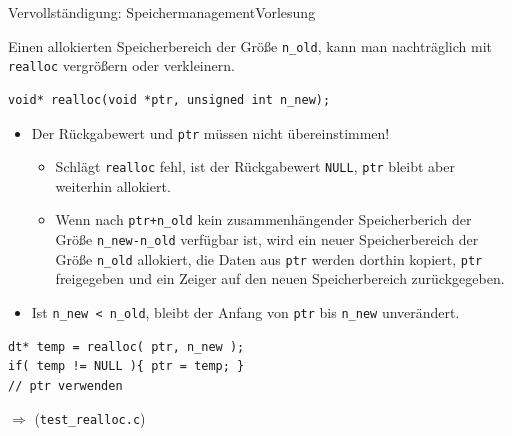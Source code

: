 \documentclass[xcolor=dvipsnames]{beamer}
\newcounter{lecturecounter}
\begin{document}
\begin{frame}[fragile]{Vervollständigung: Speichermanagement}{Vorlesung }
\begin{block}{}
  Einen allokierten Speicherbereich der Größe \verb|n_old|, kann man nachträglich mit \verb|realloc| vergrößern oder verkleinern.
\end{block}
\begin{lstlisting}
void* realloc(void *ptr, unsigned int n_new);
\end{lstlisting}
\begin{itemize}
  \item{Der Rückgabewert und \verb|ptr| müssen nicht übereinstimmen!}
  \begin{itemize}
    \item{Schlägt \verb|realloc| fehl, ist der Rückgabewert \verb|NULL|, \verb|ptr| bleibt aber weiterhin allokiert.}
    \item{Wenn nach \verb|ptr+n_old| kein zusammenhängender Speicherberich der Größe \verb|n_new-n_old| verfügbar ist, wird ein neuer Speicherbereich der Größe \verb|n_old| allokiert, die Daten aus \verb|ptr| werden dorthin kopiert, \verb|ptr| freigegeben und ein Zeiger auf den neuen Speicherbereich zurückgegeben.}
  \end{itemize}
  \item{Ist \verb|n_new < n_old|, bleibt der Anfang von \verb|ptr| bis \verb|n_new| unverändert.}
\end{itemize}
\begin{lstlisting}
dt* temp = realloc( ptr, n_new );
if( temp != NULL ){ ptr = temp; }
// ptr verwenden
\end{lstlisting}
  
  $\Rightarrow$ (\verb|test_realloc.c|)
\end{frame}
\end{document}
